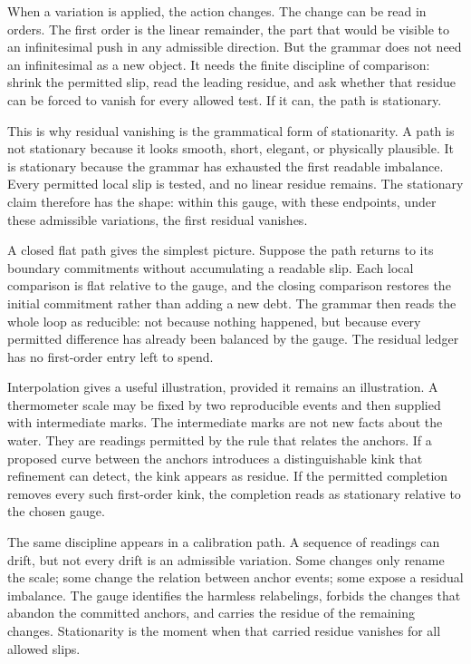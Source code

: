 When a variation is applied, the action changes. The change can be read in
orders. The first order is the linear remainder, the part that would be
visible to an infinitesimal push in any admissible direction. But the
grammar does not need an infinitesimal as a new object. It needs the finite
discipline of comparison: shrink the permitted slip, read the leading
residue, and ask whether that residue can be forced to vanish for every
allowed test. If it can, the path is stationary.

This is why residual vanishing is the grammatical form of stationarity. A
path is not stationary because it looks smooth, short, elegant, or
physically plausible. It is stationary because the grammar has exhausted the
first readable imbalance. Every permitted local slip is tested, and no
linear residue remains. The stationary claim therefore has the shape:
within this gauge, with these endpoints, under these admissible variations,
the first residual vanishes.

A closed flat path gives the simplest picture. Suppose the path returns to
its boundary commitments without accumulating a readable slip. Each local
comparison is flat relative to the gauge, and the closing comparison
restores the initial commitment rather than adding a new debt. The grammar
then reads the whole loop as reducible: not because nothing happened, but
because every permitted difference has already been balanced by the
gauge. The residual ledger has no first-order entry left to spend.

Interpolation gives a useful illustration, provided it remains an
illustration. A thermometer scale may be fixed by two reproducible events
and then supplied with intermediate marks. The intermediate marks are not
new facts about the water. They are readings permitted by the rule that
relates the anchors. If a proposed curve between the anchors introduces a
distinguishable kink that refinement can detect, the kink appears as
residue. If the permitted completion removes every such first-order kink,
the completion reads as stationary relative to the chosen gauge.

The same discipline appears in a calibration path. A sequence of readings
can drift, but not every drift is an admissible variation. Some changes
only rename the scale; some change the relation between anchor events; some
expose a residual imbalance. The gauge identifies the harmless relabelings,
forbids the changes that abandon the committed anchors, and carries the
residue of the remaining changes. Stationarity is the moment when that
carried residue vanishes for all allowed slips.

